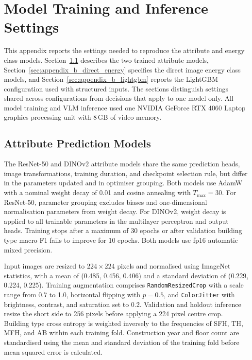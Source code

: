 \chapter{Model Training and Inference Settings}
\label{ch:appendix_b}

This appendix reports the settings needed to reproduce the attribute and energy class models.
Section~\ref{sec:appendix_b_vision_configs} describes the two trained attribute models, Section~\ref{sec:appendix_b_direct_energy} specifies the direct image energy class models, and Section~\ref{sec:appendix_b_lightgbm} reports the \acs{LightGBM} configuration used with structured inputs.
The sections distinguish settings shared across configurations from decisions that apply to one model only.
All model training and \ac{VLM} inference used one NVIDIA GeForce RTX 4060 Laptop graphics processing unit with 8\,GB of video memory.

\section{Attribute Prediction Models}
\label{sec:appendix_b_vision_configs}

The ResNet-50 and DINOv2 attribute models share the same prediction heads, image transformations, training duration, and checkpoint selection rule, but differ in the parameters updated and in optimiser grouping.
Both models use AdamW with a nominal weight decay of 0.01 and cosine annealing with \(T_{\max}=30\).
For ResNet-50, parameter grouping excludes biases and one-dimensional normalisation parameters from weight decay.
For DINOv2, weight decay is applied to all trainable parameters in the multilayer perceptron and output heads.
Training stops after a maximum of 30 epochs or after validation building type macro F1 fails to improve for 10 epochs.
Both models use fp16 automatic mixed precision.

Input images are resized to \(224 \times 224\) pixels and normalised using ImageNet statistics, with a mean of (0.485, 0.456, 0.406) and a standard deviation of (0.229, 0.224, 0.225).
Training augmentation comprises \texttt{RandomResizedCrop} with a scale range from 0.7 to 1.0, horizontal flipping with \(p=0.5\), and \texttt{ColorJitter} with brightness, contrast, and saturation set to 0.2.
Validation and holdout inference resize the short side to 256 pixels before applying a 224 pixel centre crop.
Building type cross entropy is weighted inversely to the frequencies of SFH, TH, MFH, and AB within each training fold.
Construction year and floor count are standardised using the mean and standard deviation of the training fold before mean squared error is calculated.

